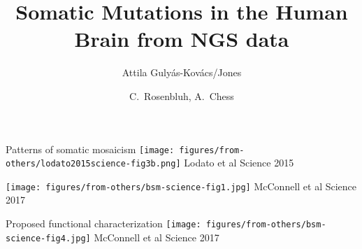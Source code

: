 \documentclass{beamer}
\title[Somatic Mutations in the Brain]{Somatic Mutations in the Human Brain from NGS data}
\author{Attila Guly\'{a}s-Kov\'{a}cs/Jones}
\date{C.~Rosenbluh, A.~Chess}
\begin{document}
\maketitle

\begin{frame}{Patterns of somatic mosaicism}
\texttt{[image: figures/from-others/lodato2015science-fig3b.png]}
\vfill
\tiny{Lodato et al Science 2015}
\end{frame}

\begin{frame}
\texttt{[image: figures/from-others/bsm-science-fig1.jpg]}
\vfill
\tiny{McConnell et al Science 2017}
\end{frame}

\begin{frame}{Proposed functional characterization}
\texttt{[image: figures/from-others/bsm-science-fig4.jpg]}
\vfill
\tiny{McConnell et al Science 2017}
\end{frame}
\end{document}
